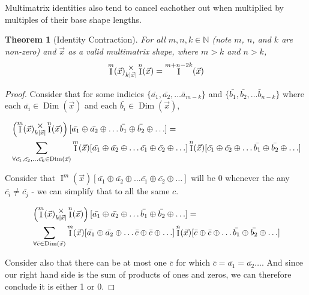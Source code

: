 \documentclass[12pt]{book}
\theoremstyle{plain}
\newtheorem{theorem}{Theorem}[chapter]
\theoremstyle{definition}
\theoremstyle{ppart}
\theoremstyle{case}
\theoremstyle{solution}
\DeclareMathOperator{\Dim}{Dim}
\DeclareMathOperator{\Ident}{I}
\newcommand{\mmult}[1]{\text{\raisebox{1ex}{$\underset{#1}{\times}$}}}
\begin{document}
Multimatrix identities also tend to cancel eachother out when multiplied by
multiples of their base shape lengths.

\begin{landscape}
\begin{theorem}[Identity Contraction]
For all $m, n, k \in \mathbb{N}$ (note $m$, $n$, and $k$ are non-zero) and $\vec{x}$ as a valid multimatrix shape,
where $m > k$ and $n > k$,
\[ \Ident^m(\vec{x}) \mmult{k|\vec{x}|} \Ident^n(\vec{x}) = \Ident^{m+n-2k}(\vec{x}) \]
\end{theorem}
\begin{proof}
Consider that for some indicies
$\{\bar{a_1}, \bar{a_2}, \ldots \bar{a}_{m-k}\}$
and $\{\bar{b_1}, \bar{b_2}, \ldots \bar{b}_{n-k}\}$ where each
$\bar{a_i} \in \Dim(\vec{x})$ and each $\bar{b_i} \in \Dim(\vec{x})$,

\begin{align*}
&\left( \Ident^m(\vec{x}) \mmult{k|\vec{x}|} \Ident^n(\vec{x}) \right)
[\bar{a_1} \oplus \bar{a_2} \oplus \ldots \bar{b_1} \oplus \bar{b_2} \oplus \ldots] = \\
&\sum_{\forall \bar{c_1}, \bar{c_2}, \ldots \bar{c_k} \in \Dim(\vec{x})}
\Ident^m(\vec{x})
[\bar{a_1} \oplus \bar{a_2} \oplus \ldots \bar{c_1} \oplus \bar{c_2} \oplus \ldots]
\Ident^n(\vec{x})
[\bar{c_1} \oplus \bar{c_2} \oplus \ldots \bar{b_1} \oplus \bar{b_2} \oplus \ldots]
\end{align*}

Consider that $\Ident^m(\vec{x})
[\bar{a_1} \oplus \bar{a_2} \oplus \ldots \bar{c_1} \oplus \bar{c_2} \oplus \ldots]$
will be 0 whenever the any $\bar{c_i} \ne \bar{c_j}$ - we can simplify that to all
the same $c$.

\begin{align*}
&\left( \Ident^m(\vec{x}) \mmult{k|\vec{x}|} \Ident^n(\vec{x}) \right)
[\bar{a_1} \oplus \bar{a_2} \oplus \ldots \bar{b_1} \oplus \bar{b_2} \oplus \ldots] = \\
&\sum_{\forall \bar{c} \in \Dim(\vec{x})}
\Ident^m(\vec{x})
[\bar{a_1} \oplus \bar{a_2} \oplus \ldots \bar{c} \oplus \bar{c} \oplus \ldots]
\Ident^n(\vec{x})
[\bar{c} \oplus \bar{c} \oplus \ldots \bar{b_1} \oplus \bar{b_2} \oplus \ldots]
\end{align*}

Consider also that there can be at most one $\bar{c}$ for which
$\bar{c} = \bar{a_1} = \bar{a_2} \ldots$. And since our right hand side is
the sum of products of ones and zeros, we can therefore conclude it is either 1 or 0.


\end{proof}
\end{landscape}
\end{document}
